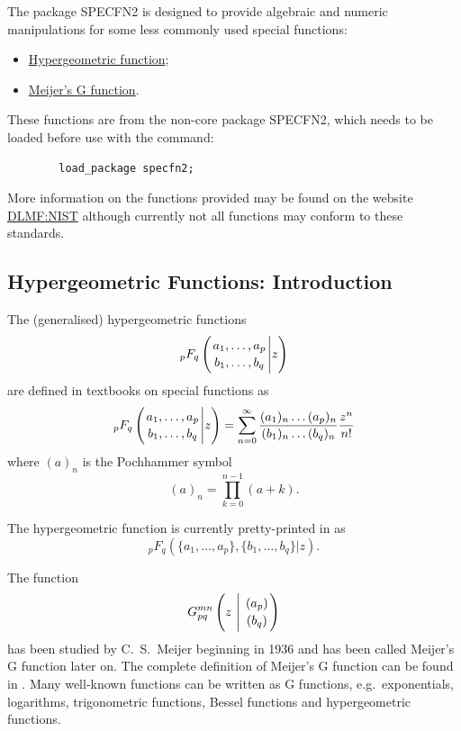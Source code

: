 

\hypertarget{SPECFNS2}{}

The package SPECFN2 is designed to provide algebraic and numeric manipulations
for some less commonly used special functions:
\begin{itemize}
\item \hyperlink{operator:HYPERGEOMETRIC}{Hypergeometric function};
\item \hyperlink{operator:MEIJERG}{Meijer's G function}.
\end{itemize}

These functions are from the non-core package SPECFN2, which
needs to be loaded before use with the command:
\begin{verbatim}
        load_package specfn2;
\end{verbatim}

More information on the functions provided may be found on the website
\href{https://dlmf.nist.gov/}{DLMF:NIST} although currently not all functions
may conform to these standards.

\subsection{Hypergeometric Functions: Introduction}
The (generalised) hypergeometric functions
\[
_pF_q \left( \genfrac{}{}{0pt}{}{a_1, \ldots , a_p}{b_1, \ldots ,b_q} \Bigg\vert z \right)
\]
are defined in textbooks on special functions as
\[
_pF_q \left( \genfrac{}{}{0pt}{}{a_1, \ldots , a_p}{b_1, \ldots ,b_q} \Bigg\vert z \right)
  = \sum_{n=0}^{\infty}\frac{(a_{1})_{n}\dots(a_{p})_{n}}{(b_{1})_{n}\dots(b_{q})_{n}}\frac{z^{n}}{n!}
\]
where $(a)_{n}$ is the Pochhammer symbol
\[
 (a)_{n} = \prod_{k=0}^{n-1} (a+k).
\]

The hypergeometric function is currently pretty-printed in \REDUCE{} as
\[
_pF_q \left( \{a_1, \ldots , a_p\},\{b_1, \ldots ,b_q\} \vert z \right).
\]

The function 
\[
G_{p q}^{m n} \left( z \  \Bigg\vert \  \genfrac{}{}{0pt}{}{(a_p)}{(b_q)} \right)
\]
has been studied by C.~S.~Meijer beginning in 1936 and has been
called Meijer's G function later on. The complete definition of Meijer's
G function can be found in \cite{Prudnikov:90c}.
Many well-known functions can be written as G functions,
e.g.\ exponentials, logarithms, trigonometric functions, Bessel functions
and hypergeometric functions.

